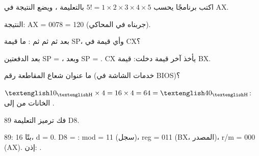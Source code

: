 \begin{tamrin}
    اكتب برنامجًا يحسب $5! = 1 \times 2 \times 3 \times 4 \times 5$ بالتعليمة ، ويضع النتيجة في \textenglish{AX}.
\end{tamrin}
\begin{hall}
    النتيجة: \textenglish{AX = 0078} = 120 (جربناه في المحاكي).
\end{hall}

\begin{tamrin}
    بعد  ثم  ثم  ثم : ما قيمة \textenglish{SP}، وأي قيمة في \textenglish{CX}؟
\end{tamrin}
\begin{hall}
    بعد الدفعتين \textenglish{SP = }، وبعد  \textenglish{SP = }.
    \textenglish{CX} يأخذ آخر قيمة دخلت: قيمة \textenglish{BX}.
\end{hall}

\begin{tamrin}
    ما عنوان شعاع المقاطعة رقم  (خدمات الشاشة في \textenglish{BIOS})؟
\end{tamrin}
\begin{hall}
    $\hex{10} \times 4 = 16 \times 4 = 64 = \hex{40}$: الخانات من  إلى .
\end{hall}

\begin{tamrin}
    فك ترميز التعليمة \textenglish{89 D8}.
\end{tamrin}
\begin{hall}
    \textenglish{89}:  16 بتًا، \textenglish{d = 0}. \textenglish{D8} = : \textenglish{mod = 11} (سجل)،
    \textenglish{reg = 011} (\textenglish{BX}، المصدر)، \textenglish{r/m = 000} (\textenglish{AX}). إذن: .
\end{hall}
